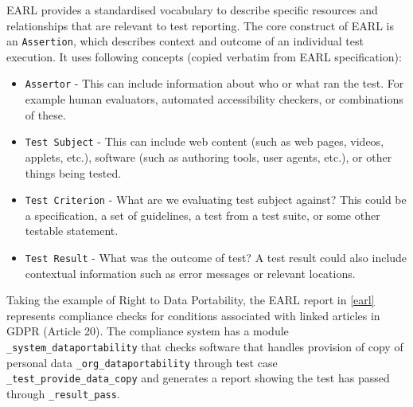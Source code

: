 EARL provides a standardised vocabulary to describe specific resources and relationships that are relevant to test reporting. The core construct of EARL is an \texttt{Assertion}, which describes context and outcome of an individual test execution. It uses following concepts (copied verbatim from EARL specification):

\begin{itemize}
    \item \texttt{Assertor} - This can include information about who or what ran the test. For example human evaluators, automated accessibility checkers, or combinations of these.
    \item \texttt{Test Subject} - This can include web content (such as web pages, videos, applets, etc.), software (such as authoring tools, user agents, etc.), or other things being tested.
    \item \texttt{Test Criterion} - What are we evaluating test subject against? This could be a specification, a set of guidelines, a test from a test suite, or some other testable statement.
    \item \texttt{Test Result} - What was the outcome of test? A test result could also include contextual information such as error messages or relevant locations.
\end{itemize}

Taking the example of Right to Data Portability, the EARL report in \autoref{earl} represents compliance checks for conditions associated with linked articles in GDPR (Article 20). The compliance system has a module \texttt{\_system\_dataportability} that checks software that handles provision of copy of personal data \texttt{\_org\_dataportability} through test case \texttt{\_test\_provide\_data\_copy} and generates a report showing the test has passed through \texttt{\_result\_pass}.


